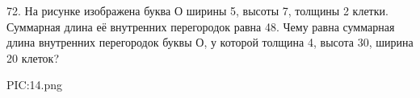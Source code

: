 72. На рисунке изображена буква О ширины 5, высоты 7, толщины 2 клетки. Суммарная длина её внутренних перегородок равна 48. Чему равна суммарная длина внутренних перегородок буквы О, у которой толщина 4, высота 30, ширина 20 клеток?
\begin{center}
{{PIC:14.png}}
\end{center}
